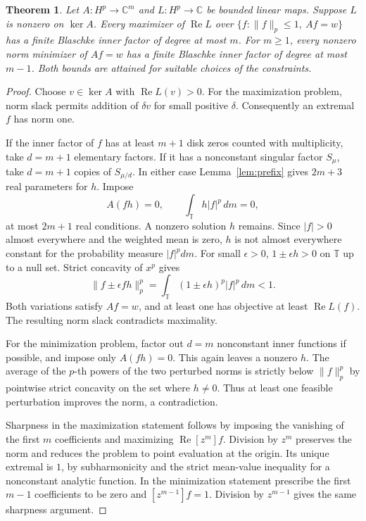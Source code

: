 \documentclass[11pt]{article}
\numberwithin{equation}{section}
\newtheorem{theorem}{Theorem}[section]
\theoremstyle{remark}
\newcommand{\T}{\mathbb T}
\newcommand{\C}{\mathbb C}
\newcommand{\norm}[1]{\lVert #1\rVert}
\newcommand{\coef}[1]{[z^{#1}]}
\newcommand{\area}{\,dm}
\newcommand{\Rea}{\operatorname{Re}}
\begin{document}
\begin{theorem}\label{thm:affine}
Let \(A:H^p\to\C^m\) and \(L:H^p\to\C\) be bounded linear maps.
Suppose \(L\) is nonzero on \(\ker A\). Every maximizer of \(\Rea L\)
over
\(\{f:\norm{f}_p\le1,\ Af=w\}\)
has a finite Blaschke inner factor of degree at most \(m\).
For \(m\ge1\), every nonzero norm minimizer of \(Af=w\) has a finite
Blaschke inner factor of degree at most \(m-1\).
Both bounds are attained for suitable choices of the constraints.
\end{theorem}
\begin{proof}
Choose \(v\in\ker A\) with \(\Rea L(v)>0\).
For the maximization problem, norm slack permits addition of
\(\delta v\) for small positive \(\delta\).
Consequently an extremal \(f\) has norm one.

If the inner factor of \(f\) has at least \(m+1\) disk zeros counted
with multiplicity, take \(d=m+1\) elementary factors.
If it has a nonconstant singular factor \(S_\mu\), take \(d=m+1\) copies
of \(S_{\mu/d}\). In either case Lemma~\ref{lem:prefix} gives \(2m+3\)
real parameters for \(h\). Impose
\[
 A(fh)=0,\qquad \int_{\T} h|f|^p\area=0 ,
\]
at most \(2m+1\) real conditions. A nonzero solution \(h\) remains.
Since \(|f|>0\) almost everywhere and the weighted mean is zero, \(h\)
is not almost everywhere constant for the probability measure
\(|f|^p dm\). For small \(\epsilon>0\), \(1\pm\epsilon h>0\) on
\(\T\) up to a null set. Strict concavity of \(x^p\) gives
\[
  \norm{f\pm\epsilon fh}_p^p
   =\int_{\T}(1\pm\epsilon h)^p |f|^p\area<1.
\]
Both variations satisfy \(Af=w\), and at least one has objective at
least \(\Rea L(f)\). The resulting norm slack contradicts maximality.

For the minimization problem, factor out \(d=m\) nonconstant inner
functions if possible, and impose only \(A(fh)=0\). This again leaves
a nonzero \(h\). The average of the \(p\)-th powers of the two perturbed norms
is strictly below \(\norm{f}_p^p\) by pointwise strict concavity on the
set where \(h\ne0\). Thus at least one feasible perturbation improves
the norm, a contradiction.

Sharpness in the maximization statement follows by imposing the
vanishing of the first \(m\) coefficients and maximizing
\(\Rea\coef{m}f\). Division by \(z^m\) preserves the norm and reduces
the problem to point evaluation at the origin. Its unique extremal
is \(1\), by subharmonicity and the strict mean-value inequality for
a nonconstant analytic function. In the minimization statement
prescribe the first \(m-1\) coefficients to be zero and
\(\coef{m-1}f=1\). Division by \(z^{m-1}\) gives the same sharpness
argument.
\end{proof}
\end{document}
